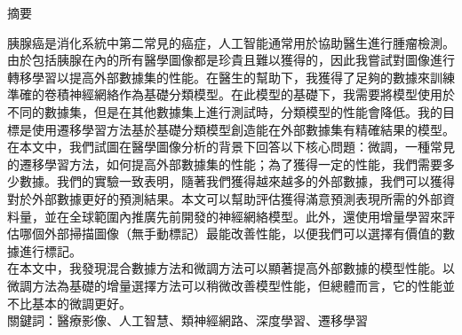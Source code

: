 
\linespread{1.25}
\begin{CJK}{UTF8}{bkai}

\begin{center}
\Large{{摘要}}\\
\end{center}
胰腺癌是消化系統中第二常見的癌症，人工智能通常用於協助醫生進行腫瘤檢測。由於包括胰腺在內的所有醫學圖像都是珍貴且難以獲得的，因此我嘗試對圖像進行轉移學習以提高外部數據集的性能。在醫生的幫助下，我獲得了足夠的數據來訓練準確的卷積神經網絡作為基礎分類模型。在此模型的基礎下，我需要將模型使用於不同的數據集，但是在其他數據集上進行測試時，分類模型的性能會降低。我的目標是使用遷移學習方法基於基礎分類模型創造能在外部數據集有精確結果的模型。 \\

在本文中，我們試圖在醫學圖像分析的背景下回答以下核心問題：微調，一種常見的遷移學習方法，如何提高外部數據集的性能；為了獲得一定的性能，我們需要多少數據。我們的實驗一致表明，隨著我們獲得越來越多的外部數據，我們可以獲得對於外部數據更好的預測結果。本文可以幫助評估獲得滿意預測表現所需的外部資料量，並在全球範圍內推廣先前開發的神經網絡模型。此外，還使用增量學習來評估哪個外部掃描圖像（無手動標記）最能改善性能，以便我們可以選擇有價值的數據進行標記。\\

在本文中，我發現混合數據方法和微調方法可以顯著提高外部數據的模型性能。以微調方法為基礎的增量選擇方法可以稍微改善模型性能，但總體而言，它的性能並不比基本的微調更好。\\

關鍵詞：醫療影像、人工智慧、類神經網路、深度學習、遷移學習
\end{CJK}
\doublespacing
